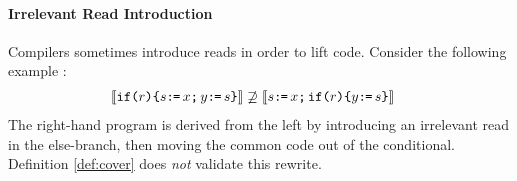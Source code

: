 













\paragraph{Irrelevant Read Introduction}
Compilers sometimes introduce reads in order to lift code.  Consider the
following example \cite[.5]{SevcikThesis}:
\begin{align*}
  \llbracket\texttt{if}\allowbreak\texttt{(}r\texttt{)} \allowbreak\texttt{\{} s \texttt{:}\mkern-1mu\texttt{=}\, x \texttt{;}\,\allowbreak y \texttt{:}\mkern-1mu\texttt{=}\, s \texttt{\}}\rrbracket
  &\not\supseteq
  \llbracket s \texttt{:}\mkern-1mu\texttt{=}\, x \texttt{;}\,\allowbreak \texttt{if}\allowbreak\texttt{(}r\texttt{)} \allowbreak\texttt{\{} y \texttt{:}\mkern-1mu\texttt{=}\, s \texttt{\}}\rrbracket
\end{align*}
The right-hand program is derived from the left by introducing an irrelevant
read in the else-branch, then moving the common code out of the
conditional.  Definition \ref{def:cover} does \emph{not} validate this rewrite.

